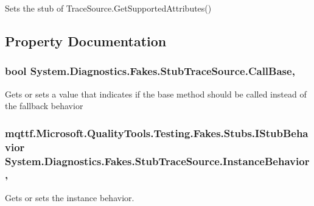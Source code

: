 Sets the stub of Trace\-Source.\-Get\-Supported\-Attributes()



\subsection{Property Documentation}
\hypertarget{class_system_1_1_diagnostics_1_1_fakes_1_1_stub_trace_source_a35842b5b0a5005bebf091a30d8b1bed3}{
\subsubsection[{Call\-Base}]{\setlength{\rightskip}{0pt plus 5cm}bool System.\-Diagnostics.\-Fakes.\-Stub\-Trace\-Source.\-Call\-Base\hspace{0.3cm}{\ttfamily [get]}, {\ttfamily [set]}}}\label{class_system_1_1_diagnostics_1_1_fakes_1_1_stub_trace_source_a35842b5b0a5005bebf091a30d8b1bed3}


Gets or sets a value that indicates if the base method should be called instead of the fallback behavior

\hypertarget{class_system_1_1_diagnostics_1_1_fakes_1_1_stub_trace_source_a726c7440116798da3ac470fe0107f921}{
\subsubsection[{Instance\-Behavior}]{\setlength{\rightskip}{0pt plus 5cm}mqttf.\-Microsoft.\-Quality\-Tools.\-Testing.\-Fakes.\-Stubs.\-I\-Stub\-Behavior System.\-Diagnostics.\-Fakes.\-Stub\-Trace\-Source.\-Instance\-Behavior\hspace{0.3cm}{\ttfamily [get]}, {\ttfamily [set]}}}\label{class_system_1_1_diagnostics_1_1_fakes_1_1_stub_trace_source_a726c7440116798da3ac470fe0107f921}


Gets or sets the instance behavior.

